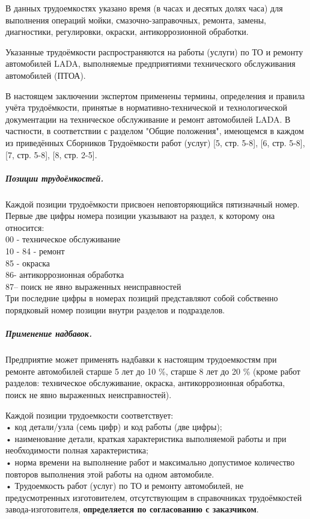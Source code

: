 В данных трудоемкостях указано время (в часах и десятых долях часа) для выполнения операций мойки, смазочно-заправочных, ремонта, замены, диагностики, регулировки, окраски, антикоррозионной обработки.

Указанные трудоёмкости  распространяются на работы (услуги) по ТО и ремонту автомобилей LADA, выполняемые
предприятиями технического обслуживания автомобилей (ПТОА). 

В настоящем заключении экспертом применены термины,  определения и правила учёта трудоёмкости, принятые в  нормативно-технической и технологической документации на техническое обслуживание и ремонт автомобилей LADA. В частности, в соответствии с разделом 
"Общие положения", имеющемся в каждом из приведённых Сборников Трудоёмкости работ (услуг) [5, стр. 5-8], [6, стр. 5-8], [7, стр. 5-8], [8, стр. 2-5].

\subparagraph{Позиции трудоёмкостей.} Каждой позиции трудоёмкости присвоен неповторяющийся пятизначный номер. Первые две цифры
номера позиции указывают на раздел, к которому она относится:\\
00 - техническое обслуживание\\
10 - 84 - ремонт\\
85 - окраска\\
86- антикоррозионная обработка\\
87– поиск не явно выраженных неисправностей\\
Три последние цифры в номерах позиций представляют собой собственно порядковый номер позиции
внутри разделов и подразделов.

\subparagraph{Применение надбавок.}  Предприятие может применять надбавки к настоящим трудоемкостям при ремонте автомобилей старше
5 лет до 10 \%, старше 8 лет до 20 \% (кроме работ разделов: техническое обслуживание, окраска,
антикоррозионная обработка, поиск не явно выраженных неисправностей).

 Каждой позиции трудоемкости соответствует:\\
	• код детали/узла (семь цифр) и код работы (две цифры);\\
	• наименование детали, краткая характеристика выполняемой работы и при необходимости полная характеристика;\\
	• норма времени на выполнение работ и максимально допустимое количество повторов выполнения этой работы на одном автомобиле.\\%
    • Трудоемкость работ (услуг) по ТО и ремонту автомобилей, не предусмотренных изготовителем, отсутствующим в справочниках трудоёмкостей завода-изготовителя, \textbf{определяется по согласованию с заказчиком}.
       
